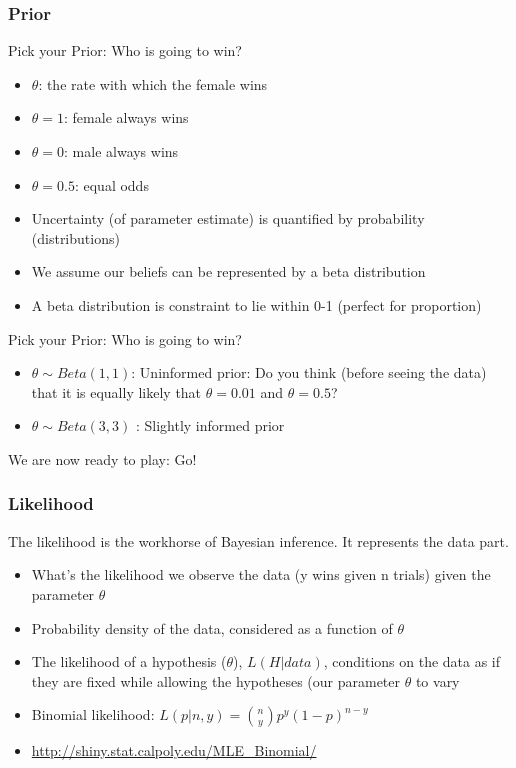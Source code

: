 \documentclass[hyperref={pdfpagelabels=false},unknownkeysallowed]{beamer}
\begin{document}
\begin{frame}
\frametitle{Prior}
Pick your Prior: Who is going to win? 
\begin{itemize}
\item $\theta$: the rate with which the female wins
\item $\theta = 1$: female always wins
\item $\theta = 0$: male always wins
\item $\theta = 0.5$: equal odds
\item Uncertainty (of parameter estimate) is quantified by probability (distributions)
\item We assume our beliefs can be represented by a beta distribution
\item A beta distribution is constraint to lie within 0-1 (perfect for proportion)
\end{itemize}
\note{}
\end{frame}

\begin{frame}
Pick your Prior: Who is going to win? 
\begin{itemize}
\item $\theta \sim Beta(1,1)$: Uninformed prior: Do you think (before seeing the data) that it is equally likely that $\theta = 0.01$ and $\theta = 0.5$? 

\item $\theta \sim Beta (3,3)$ : Slightly informed prior
\end{itemize}

We are now ready to play: Go!
\note{}
\end{frame}


\begin{frame}
\frametitle{Likelihood}
The likelihood is the workhorse of Bayesian inference. It represents the data part. 
\begin{itemize}
\item What's the likelihood we observe the data (y wins given n trials)  given the parameter $\theta$
\item Probability density of the data, considered as a function of $\theta$
\item The likelihood of a hypothesis ($\theta$), $L(H|data)$, conditions on the data as if they are fixed while allowing the hypotheses (our parameter $ \theta$ to vary
\item Binomial likelihood: $L(p|n,y)={n \choose y} p^y (1-p)^{n-y}$

\item \url{http://shiny.stat.calpoly.edu/MLE_Binomial/}
\end{itemize}
\note{}
\end{frame}
\end{document}
